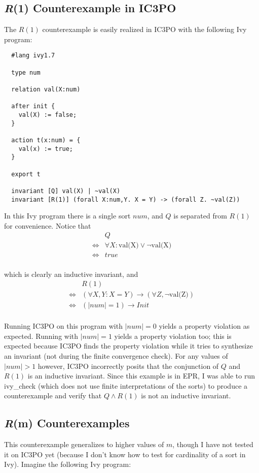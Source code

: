 \documentclass[12pt]{article}
\begin{document}
\subsection{\textit{R}(1) Counterexample in IC3PO}
The $R(1)$ counterexample is easily realized in IC3PO with the following Ivy program:

\begin{verbatim}
  #lang ivy1.7

  type num

  relation val(X:num)

  after init {
    val(X) := false;
  }

  action t(x:num) = {
    val(x) := true;
  }

  export t

  invariant [Q] val(X) | ~val(X)
  invariant [R(1)] (forall X:num,Y. X = Y) -> (forall Z. ~val(Z))
\end{verbatim}

In this Ivy program there is a single sort $num$, and $Q$ is separated from $R(1)$ for convenience.  Notice that
\begin{align*}
  &Q\\
  \iff &\forall X: \text{val(X)} \lor \neg\text{val(X)}\\
  \iff &true\\
\end{align*}

which is clearly an inductive invariant, and
\begin{align*}
  &R(1)\\
  \iff &(\forall X,Y: X=Y) \rightarrow (\forall Z, \neg\text{val(Z)})\\
  \iff &(|num|=1) \rightarrow Init\\
\end{align*}

Running IC3PO on this program with $|num|=0$ yields a property violation as expected.  Running with $|num|=1$ yields a property violation too; this is expected because IC3PO finds the property violation while it tries to synthesize an invariant (not during the finite convergence check).  For any values of $|num|>1$ however, IC3PO incorrectly posits that the conjunction of $Q$ and $R(1)$ is an inductive invariant.  Since this example is in EPR, I was able to run ivy\_check (which does not use finite interpretations of the sorts) to produce a counterexample and verify that $Q \land R(1)$ is not an inductive invariant.

\subsection{\textit{R}(m) Counterexamples}
This counterexample generalizes to higher values of $m$, though I have not tested it on IC3PO yet (because I don't know how to test for cardinality of a sort in Ivy).  Imagine the following Ivy program:
\end{document}
